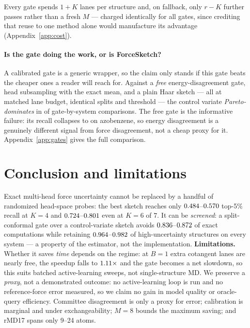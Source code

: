 \documentclass{article}
\begin{document}
Every gate spends $1{+}K$ lanes per structure and, on fallback, only $r{-}K$ further passes rather
than a fresh $M$ --- charged identically for all gates, since crediting that reuse to one method
alone would manufacture its advantage (Appendix~\ref{app:cost}).

\paragraph{Is the gate doing the work, or is ForceSketch?}
A calibrated gate is a generic wrapper, so the claim only stands if this gate beats the cheaper ones
a reader will reach for. Against a \emph{free} energy-disagreement gate, head subsampling with the
exact mean, and a plain Haar sketch --- all at matched lane budget, identical splits and threshold
--- the control variate \emph{Pareto-dominates} in \fsGateCVDominates{} of \fsGateCVComparisons{}
gate-by-system comparisons. The free gate is the informative failure: its recall collapses to
\fsGateEnergyRecallAzobenzene{} on azobenzene, so energy disagreement is a genuinely different
signal from force disagreement, not a cheap proxy for it. Appendix~\ref{app:gates} gives the full
comparison.

\section{Conclusion and limitations}
\label{sec:limitations}
Exact multi-head force uncertainty cannot be replaced by a handful of randomized head-space probes:
the best sketch reaches only $0.484$--$0.570$ top-5\% recall at $K{=}4$
and $0.724$--$0.801$ even at $K{=}6$ of $7$. It can be \emph{screened}:
a split-conformal gate over a control-variate sketch avoids $0.836$--$0.872$ of
exact computations while retaining $0.964$--$0.982$ of high-uncertainty
structures on every system --- a property of the estimator, not the implementation.
\textbf{Limitations.} Whether it saves \emph{time} depends on the regime: at $B{=}1$ extra cotangent
lanes are nearly free, the speedup falls to $1.11\times$ and the gate becomes a net
slowdown, so this suits batched active-learning sweeps, not single-structure MD. We preserve a
\emph{proxy}, not a demonstrated outcome: no active-learning loop is run and no reference-force error
measured, so we claim no gain in model quality or oracle-query efficiency. Committee disagreement is
only a proxy for error; calibration is marginal and under exchangeability; $M{=}8$ bounds the maximum
saving; and rMD17 spans only 9--24 atoms.
\end{document}
